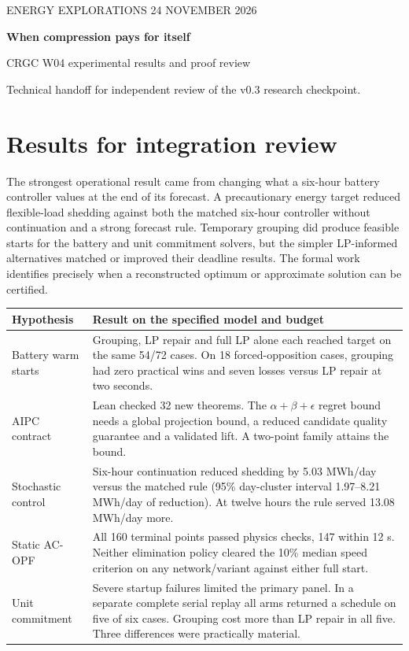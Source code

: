 \documentclass[10pt,letterpaper]{article}
\newcommand{\sect}[1]{\section*{\color{ink}#1}}
\begin{document}
{\color{accent}\small ENERGY EXPLORATIONS \hfill 24 NOVEMBER 2026}\par
{\LARGE\bfseries\color{ink} When compression pays for itself}\par
{\large CRGC W04 experimental results and proof review}\par
Technical handoff for independent review of the v0.3 research checkpoint.\par
\sect{Results for integration review}
The strongest operational result came from changing what a six-hour battery controller values at the end of its forecast. A precautionary energy target reduced flexible-load shedding against both the matched six-hour controller without continuation and a strong forecast rule. Temporary grouping did produce feasible starts for the battery and unit commitment solvers, but the simpler LP-informed alternatives matched or improved their deadline results. The formal work identifies precisely when a reconstructed optimum or approximate solution can be certified.

\begin{tabularx}{\linewidth}{@{}p{.95in}X@{}}
\toprule
Hypothesis & Result on the specified model and budget\\\midrule
Battery warm starts & Grouping, LP repair and full LP alone each reached target on the same 54/72 cases. On 18 forced-opposition cases, grouping had zero practical wins and seven losses versus LP repair at two seconds.\\[3pt]
AIPC contract & Lean checked 32 new theorems. The $\alpha+\beta+\epsilon$ regret bound needs a global projection bound, a reduced candidate quality guarantee and a validated lift. A two-point family attains the bound.\\[3pt]
Stochastic control & Six-hour continuation reduced shedding by 5.03 MWh/day versus the matched rule (95\% day-cluster interval 1.97--8.21 MWh/day of reduction). At twelve hours the rule served 13.08 MWh/day more.\\[3pt]
Static AC-OPF & All 160 terminal points passed physics checks, 147 within 12 s. Neither elimination policy cleared the 10\% median speed criterion on any network/variant against either full start.\\[3pt]
Unit commitment & Severe startup failures limited the primary panel. In a separate complete serial replay all arms returned a schedule on five of six cases. Grouping cost more than LP repair in all five. Three differences were practically material.\\\bottomrule
\end{tabularx}
\end{document}
